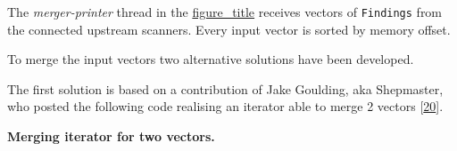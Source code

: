 The \emph{merger-printer} thread in the
\protect\hyperlink{data-processing-and-threads}{figure\_title} receives
vectors of \texttt{Findings} from the connected upstream scanners. Every
input vector is sorted by memory offset.

To merge the input vectors two alternative solutions have been
developed.

The first solution is based on a contribution of Jake Goulding, aka
Shepmaster, who posted the following code realising an iterator able to
merge 2 vectors {[}\protect\hyperlink{goulding2015}{20}{]}.

\textbf{Merging iterator for two vectors.}

\begin{Shaded}
\begin{Highlighting}[]
 
 

 
     \NormalTok{,}
\NormalTok{\{}
\NormalTok{\}}

     \NormalTok{,}
\NormalTok{\{}
      \NormalTok{\{}
        \NormalTok{\}}
    \NormalTok{\}}
\NormalTok{\}}


\end{Highlighting}
\end{Shaded}
